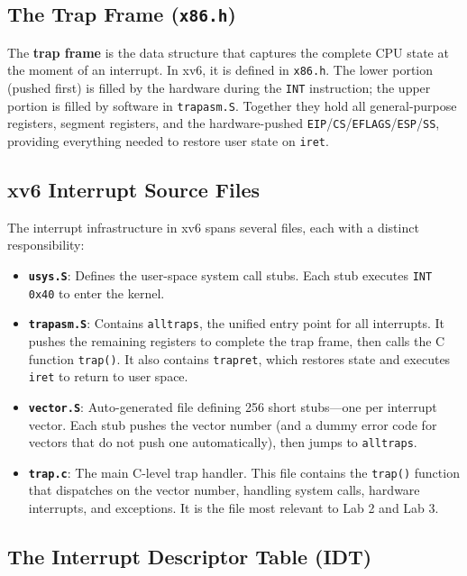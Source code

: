 \documentclass[11pt]{article}
\begin{document}
\subsection{The Trap Frame (\texttt{x86.h})}

The \textbf{trap frame} is the data structure that captures the complete CPU state at the moment of an interrupt. In xv6, it is defined in \texttt{x86.h}. The lower portion (pushed first) is filled by the hardware during the \texttt{INT} instruction; the upper portion is filled by software in \texttt{trapasm.S}. Together they hold all general-purpose registers, segment registers, and the hardware-pushed \texttt{EIP}/\texttt{CS}/\texttt{EFLAGS}/\texttt{ESP}/\texttt{SS}, providing everything needed to restore user state on \texttt{iret}.

\subsection{xv6 Interrupt Source Files}

The interrupt infrastructure in xv6 spans several files, each with a distinct responsibility:

\begin{itemize}
    \item \textbf{\texttt{usys.S}}: Defines the user-space system call stubs. Each stub executes \texttt{INT 0x40} to enter the kernel.
    \item \textbf{\texttt{trapasm.S}}: Contains \texttt{alltraps}, the unified entry point for all interrupts. It pushes the remaining registers to complete the trap frame, then calls the C function \texttt{trap()}. It also contains \texttt{trapret}, which restores state and executes \texttt{iret} to return to user space.
    \item \textbf{\texttt{vector.S}}: Auto-generated file defining 256 short stubs---one per interrupt vector. Each stub pushes the vector number (and a dummy error code for vectors that do not push one automatically), then jumps to \texttt{alltraps}.
    \item \textbf{\texttt{trap.c}}: The main C-level trap handler. This file contains the \texttt{trap()} function that dispatches on the vector number, handling system calls, hardware interrupts, and exceptions. It is the file most relevant to Lab 2 and Lab 3.
\end{itemize}

\subsection{The Interrupt Descriptor Table (IDT)}
\end{document}
